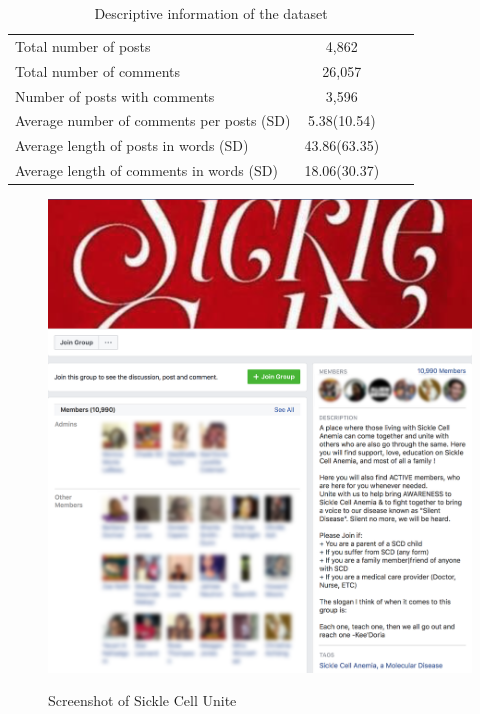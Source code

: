 \documentclass{llncs}
\begin{document}
\begin{table}[h!tb]
\centering
\begin{tabular}{lccc}
\toprule
 Total number of posts & 4,862\\
 Total number of comments & 26,057\\
 Number of posts with comments & 3,596\\
 Average number of comments per posts (SD) & 5.38(10.54)\\
 Average length of posts in words (SD) & 43.86(63.35)\\
 Average length of comments in words (SD) & 18.06(30.37)\\
\bottomrule
\end{tabular}
\label{tab:descriptive}
\caption{Descriptive information of the dataset}
\end{table}

\begin{figure}[ht!tb]
\centering
\includegraphics[width=1\textwidth]{scuscreenshot}
\label{fig:scu}
\caption{Screenshot of Sickle Cell Unite}
\end{figure}

\end{document}
